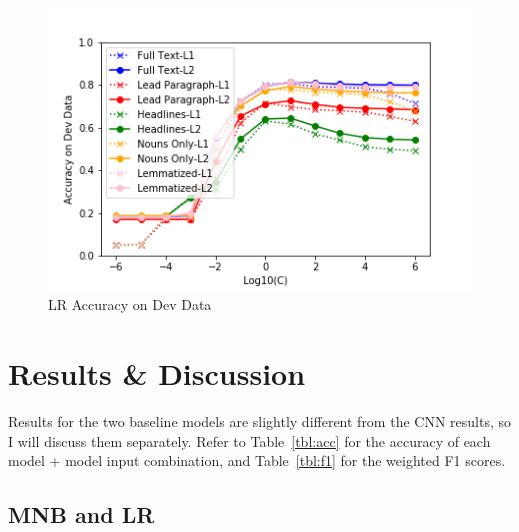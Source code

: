 \documentclass[11pt,a4paper,table]{article}
\begin{document}
\begin{figure}
\centering
\includegraphics[scale=0.57]{lr_accuracy}
\caption{LR Accuracy on Dev Data}
\label{fig:lr-acc}
\end{figure}

\begin{table}
\centering
{}
\caption{CNN Vocabulary and Padding Sizes}
\label{tbl:cnn}
\end{table}

\section{Results \& Discussion}
\label{sec:results}

Results for the two baseline models are slightly different from the CNN results, so I will discuss them separately. Refer to Table~\ref{tbl:acc} for the accuracy of each model + model input combination, and Table~\ref{tbl:f1} for the weighted F1 scores.

\subsection{MNB and LR}
\label{ssec:mnb-lr2}
\end{document}
